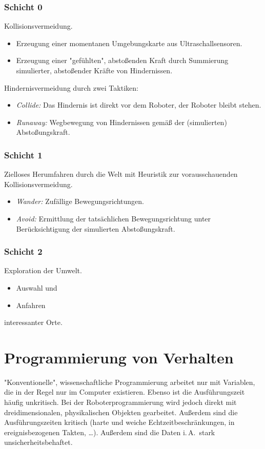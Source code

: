\documentclass[a4paper, 11pt, accentcolor = tud3b]{tudreport}
\newcommand{\iA}{i.\,A.~}
\begin{document}
				\subsubsection{Schicht 0}
					Kollisionsvermeidung.
						
					\begin{itemize}
						\item Erzeugung einer momentanen Umgebungskarte aus Ultraschallsensoren.
						\item Erzeugung einer "gefühlten", abstoßenden Kraft durch Summierung simulierter, abstoßender Kräfte von Hindernissen.
					\end{itemize}
					
					Hindernisvermeidung durch zwei Taktiken:
					\begin{itemize}
						\item \emph{Collide:} Das Hindernis ist direkt vor dem Roboter, der Roboter bleibt stehen.
						\item \emph{Runaway:} Wegbewegung von Hindernissen gemäß der (simulierten) Abstoßungskraft.
					\end{itemize}

				\subsubsection{Schicht 1}
					Zielloses Herumfahren durch die Welt mit Heuristik zur vorausschauenden Kollisionsvermeidung.
					
					\begin{itemize}
						\item \emph{Wander:} Zufällige Bewegungsrichtungen.
						\item \emph{Avoid:} Ermittlung der tatsächlichen Bewegungsrichtung unter Berücksichtigung der simulierten Abstoßungskraft.
					\end{itemize}

				\subsubsection{Schicht 2}
					Exploration der Umwelt.
					
					\begin{itemize}
						\item Auswahl und
						\item Anfahren
					\end{itemize}
					interessanter Orte.

		\section{Programmierung von Verhalten}
			"Konventionelle", wissenschaftliche Programmierung arbeitet nur mit Variablen, die in der Regel nur im Computer existieren. Ebenso ist die Ausführungszeit häufig unkritisch. Bei der Roboterprogrammierung wird jedoch direkt mit dreidimensionalen, physikalischen Objekten gearbeitet. Außerdem sind die Ausführungszeiten kritisch (harte und weiche Echtzeitbeschränkungen, in ereignisbezogenen Takten, \dots). Außerdem sind die Daten \iA stark unsicherheitsbehaftet.
			
\end{document}
